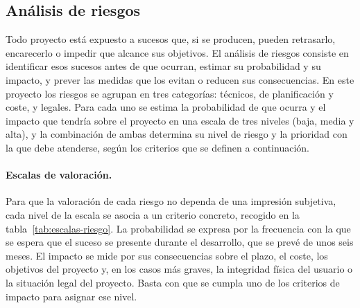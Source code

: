 \subsection{Análisis de riesgos}
\label{sec:riesgos}

Todo proyecto está expuesto a sucesos que, si se producen, pueden retrasarlo, encarecerlo o impedir que alcance sus objetivos. El análisis de riesgos consiste en identificar esos sucesos antes de que ocurran, estimar su probabilidad y su impacto, y prever las medidas que los evitan o reducen sus consecuencias. En este proyecto los riesgos se agrupan en tres categorías: técnicos, de planificación y coste, y legales. Para cada uno se estima la probabilidad de que ocurra y el impacto que tendría sobre el proyecto en una escala de tres niveles (baja, media y alta), y la combinación de ambas determina su nivel de riesgo y la prioridad con la que debe atenderse, según los criterios que se definen a continuación.


	\paragraph{Escalas de valoración.}
	Para que la valoración de cada riesgo no dependa de una impresión subjetiva, cada nivel de la escala se asocia a un criterio concreto, recogido en la tabla~\ref{tab:escalas-riesgo}. La probabilidad se expresa por la frecuencia con la que se espera que el suceso se presente durante el desarrollo, que se prevé de unos seis meses. El impacto se mide por sus consecuencias sobre el plazo, el coste, los objetivos del proyecto y, en los casos más graves, la integridad física del usuario o la situación legal del proyecto. Basta con que se cumpla uno de los criterios de impacto para asignar ese nivel.
	

